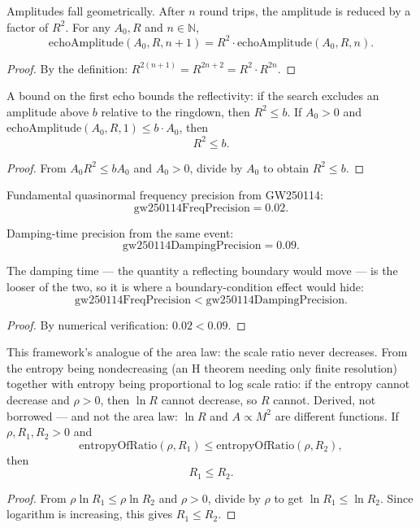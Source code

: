 \begin{theorem}
Amplitudes fall geometrically. After $n$ round trips, the amplitude is reduced by a factor of $R^2$. For any $A_0, R$ and $n \in \mathbb{N}$,
\[
\text{echoAmplitude}(A_0, R, n+1) = R^2 \cdot \text{echoAmplitude}(A_0, R, n).
\]
\begin{proof}
By the definition: $R^{2(n+1)} = R^{2n+2} = R^2 \cdot R^{2n}$.
\end{proof}
\end{theorem}

\begin{theorem}
A bound on the first echo bounds the reflectivity: if the search excludes an amplitude above $b$ relative to the ringdown, then $R^2 \leq b$. If $A_0 > 0$ and $\text{echoAmplitude}(A_0, R, 1) \leq b \cdot A_0$, then
\[
R^2 \leq b.
\]
\begin{proof}
From $A_0 R^2 \leq b A_0$ and $A_0 > 0$, divide by $A_0$ to obtain $R^2 \leq b$.
\end{proof}
\end{theorem}

\begin{definition}
Fundamental quasinormal frequency precision from GW250114:
\[
\text{gw250114FreqPrecision} = 0.02.
\]
\end{definition}

\begin{definition}
Damping-time precision from the same event:
\[
\text{gw250114DampingPrecision} = 0.09.
\]
\end{definition}

\begin{theorem}
The damping time — the quantity a reflecting boundary would move — is the looser of the two, so it is where a boundary-condition effect would hide:
\[
\text{gw250114FreqPrecision} < \text{gw250114DampingPrecision}.
\]
\begin{proof}
By numerical verification: $0.02 < 0.09$.
\end{proof}
\end{theorem}

\begin{theorem}
This framework's analogue of the area law: the scale ratio never decreases. From the entropy being nondecreasing (an H theorem needing only finite resolution) together with entropy being proportional to log scale ratio: if the entropy cannot decrease and $\rho > 0$, then $\ln R$ cannot decrease, so $R$ cannot. Derived, not borrowed — and not the area law: $\ln R$ and $A \propto M^2$ are different functions. If $\rho, R_1, R_2 > 0$ and
\[
\text{entropyOfRatio}(\rho, R_1) \leq \text{entropyOfRatio}(\rho, R_2),
\]
then
\[
R_1 \leq R_2.
\]
\begin{proof}
From $\rho \ln R_1 \leq \rho \ln R_2$ and $\rho > 0$, divide by $\rho$ to get $\ln R_1 \leq \ln R_2$. Since logarithm is increasing, this gives $R_1 \leq R_2$.
\end{proof}
\end{theorem}

